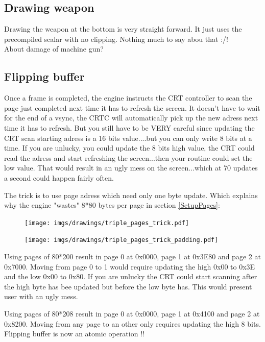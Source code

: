 \subsection{Drawing weapon}
Drawing the weapon at the bottom is very straight forward. It just uses the precompiled scalar with no clipping. Nothing much to say abou that :/!\\
 About damage of machine gun?





\subsection{Flipping buffer} \label{Flippingbuffer}
Once a frame is completed, the engine instructs the CRT controller to scan the page just completed next time it has to refresh the screen. It doesn't have to wait for the end of a vsync, the CRTC will automatically pick up the new adress next time it has to refresh. But you still have to be VERY careful since updating the CRT scan starting adress is a 16 bits value....but you can only write 8 bits at a time. If you are unlucky, you could update the 8 bits high value, the CRT could read the adress and start refreshing the screen...then your routine could set the low value. That would result in an ugly mess on the screen...which at 70 updates a second could happen fairly often.\\
\par
The trick is to use page adress which need only one byte update. Which explains why the engine "wastes" 8*80 bytes per page in section \ref{SetupPages}:\\
\par
\begin{figure}[H]
 \centering
 \texttt{[image: imgs/drawings/triple\_pages\_trick.pdf]}
\end{figure}
\par

\par
\begin{figure}[H]
 \centering
 \texttt{[image: imgs/drawings/triple\_pages\_trick\_padding.pdf]}
\end{figure}
\par


Using pages of 80*200 result in page 0 at 0x0000, page 1 at 0x3E80 and page 2 at 0x7000. Moving from page 0 to 1 would require updating the high 0x00 to 0x3E and the low 0x00 to 0x80. If you are unlucky the CRT could start scanning after the high byte has bee updated but before the low byte has. This would present user with an ugly mess.\\
\par
Using pages of 80*208 result in page 0 at 0x0000, page 1 at 0x4100 and page 2 at 0x8200. Moving from any page to an other only requires updating the high 8 bits. Flipping buffer is now an atomic operation !!\\





